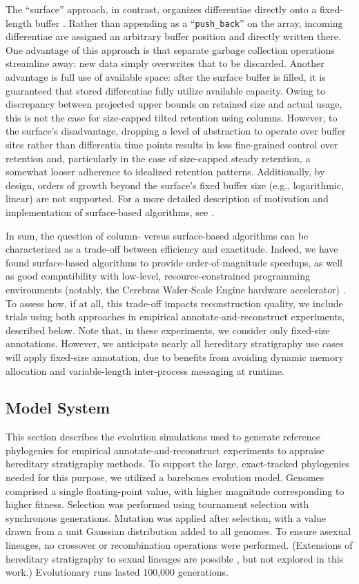 The ``surface'' approach, in contrast, organizes differentiae directly onto a fixed-length buffer \citep{moreno2024structured}.
Rather than appending as a ``\texttt{push\_back}'' on the array, incoming differentiae are assigned an arbitrary buffer position and directly written there.
One advantage of this approach is that separate garbage collection operations streamline away: new data simply overwrites that to be discarded.
Another advantage is full use of available space: after the surface buffer is filled, it is guaranteed that stored differentiae fully utilize available capacity.
Owing to discrepancy between projected upper bounds on retained size and actual usage, this is not the case for size-capped tilted retention using columns.
However, to the surface's disadvantage, dropping a level of abstraction to operate over buffer sites rather than differentia time points results in less fine-grained control over retention and, particularly in the case of size-capped steady retention, a somewhat looser adherence to idealized retention patterns.
Additionally, by design, orders of growth beyond the surface's fixed buffer size (e.g., logarithmic, linear) are not supported.
For a more detailed description of motivation and implementation of surface-based algorithms, see \citep{moreno2024trackable}.

In sum, the question of column- versus surface-based algorithms can be characterized as a trade-off between efficiency and exactitude.
Indeed, we have found surface-based algorithms to provide order-of-magnitude speedups, as well as good compatibility with low-level, resource-constrained programming environments (notably, the Cerebras Wafer-Scale Engine hardware accelerator) \citep{moreno2024trackable}.
To assess how, if at all, this trade-off impacts reconstruction quality, we include trials using both approaches in empirical annotate-and-reconstruct experiments, described below.
Note that, in these experiments, we consider only fixed-size annotations.
However, we anticipate nearly all hereditary stratigraphy use cases will apply fixed-size annotation, due to benefits from avoiding dynamic memory allocation and variable-length inter-process messaging at runtime.

\subsection{Model System}

This section describes the evolution simulations used to generate reference phylogenies for empirical annotate-and-reconstruct experiments to appraise hereditary stratigraphy methods.
To support the large, exact-tracked phylogenies needed for this purpose, we utilized a barebones evolution model.
Genomes comprised a single floating-point value, with higher magnitude corresponding to higher fitness.
Selection was performed using tournament selection with synchronous generations.
Mutation was applied after selection, with a value drawn from a unit Gaussian distribution added to all genomes.
To ensure asexual lineages, no crossover or recombination operations were performed.
(Extensions of hereditary stratigraphy to sexual lineages are possible \citep{moreno2024methods}, but not explored in this work.)
Evolutionary runs lasted 100,000 generations.

